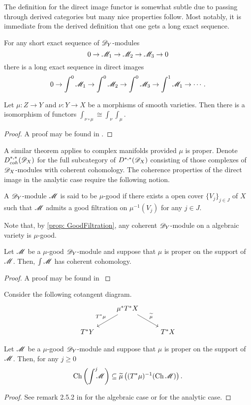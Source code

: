 The definition for the direct image functor is somewhat subtle due to passing through derived categories but many nice properties follow.
Most notably, it is immediate from the derived definition that one gets a long exact sequence.
\begin{proposition}
    For any short exact sequence of $\mathscr{D}_Y$-modules
    $$0 \to \mathscr{M}_1 \to \mathscr{M}_2 \to \mathscr{M}_3 \to 0 $$
    there is a long exact sequence in direct images
    $$0 \to \int^0\mathscr{M}_1 \to \int^0 \mathscr{M}_2 \to \int^0 \mathscr{M}_3 \to \int^1 \mathscr{M}_1 \to \cdots.$$
\end{proposition}
\begin{proposition}
  Let $\mu:Z\to Y$ and $\nu:Y\to X$ be a morphisms of smooth varieties. Then there is a isomorphism of functors $\int_{\nu\circ \mu} \cong \int_\nu \int_\mu$.
\end{proposition}
\begin{proof}
  A proof may be found in \cite[Chapter 6]{borel1987algebraic}.
\end{proof}
A similar theorem applies to complex manifolds provided $\mu$ is proper.
Denote $D_{coh}^{*,*}(\mathscr{D}_X)$ for the full subcategory of $D^{*,*}(\mathscr{D}_X)$ consisting of those complexes of $\mathscr{D}_X$-modules with coherent cohomology.
The coherence properties of the direct image in the analytic case require the following notion.
\begin{definition}
  A $\mathscr{D}_Y$-module $\mathscr{M}$ is said to be $\mu$-good if there exists a open cover $\{V_j\}_{j\in J}$ of $X$ such that $\mathscr{M}$ admits a good filtration on $\mu^{-1}(V_j)$ for any $j\in J$.
\end{definition}
Note that, by \cref{prop: GoodFiltration}, any coherent $\mathscr{D}_Y$-module on a algebraic variety is $\mu$-good.
\begin{theorem}\label{thm: MuGoodCoherent}
  Let $\mathscr{M}$ be a $\mu$-good $\mathscr{D}_Y$-module and suppose that $\mu$ is proper on the support of $\mathscr{M}$.
  Then, $\int \mathscr{M}$ has coherent cohomology.
\end{theorem}
\begin{proof}
  A proof may be found in \cite[Chapter 3]{sabbah2011introduction}
\end{proof}
Consider the following cotangent diagram.
$$
\begin{tikzcd}
    & \mu^* T^* X\arrow[swap]{ld}{T^* \mu} \arrow{rd}{\widetilde{\mu}} & \\
    T^* Y & & T^*X
\end{tikzcd}
$$
\begin{proposition}\label{prop: EstimateProper}
  Let $\mathscr{M}$ be a $\mu$-good $\mathscr{D}_Y$-module and suppose that $\mu$ is proper on the support of $\mathscr{M}$. Then, for any $j\geq 0$
  $$\operatorname{Ch}\left(\int^j \mkern -8mu \mathscr{M} \right)\subseteq  \widetilde{\mu}\left((T^*\mu)^{-1}(\operatorname{Ch} \mathscr{M}) \right).$$
\end{proposition}
\begin{proof}
  See remark 2.5.2 in \cite[Chapter 2]{hotta2007d} for the algebraic case or \cite[Chapter 3]{sabbah2011introduction} for the analytic case.
\end{proof}
